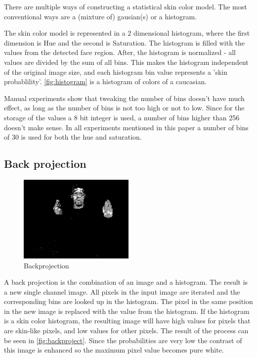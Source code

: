 There are multiple ways of constructing a statistical skin color model. The most conventional ways are a (mixture of) gausian(s) or a histogram. 

The skin color model is represented in a 2 dimensional histogram, where the first dimension is Hue and the second is Saturation. The histogram is filled with the values from the detected face region. After, the histogram is normalized - all values are divided by the sum of all bins. This makes the histogram independent of the original image size, and each histogram bin value represents a 'skin probablility'. \autoref{fig:histogram} is a histogram of colors of a caucasian.

Manual experiments show that tweaking the number of bins doesn't have much effect, as long as the number of bins is not too high or not to low. Since for the storage of the values a 8 bit integer is used, a number of bins higher than 256 doesn't make sense. In all experiments mentioned in this paper a number of bins of 30 is used for both the hue and saturation.

\subsection*{Back projection}

\begin{figure}[htbp]
    \center{}
    \includegraphics[width=0.5\textwidth]{figures/pipeline/backproject.jpg}
 	\caption{Backprojection}
	\label{fig:backproject}
\end{figure}


A back projection is the combination of an image and a histogram. The result is a new single channel image. All pixels in the input image are iterated and the corresponding bins are looked up in the histogram. The pixel in the same position in the new image is replaced with the value from the histogram. If the histogram is a skin color histogram, the resulting image will have high values for pixels that are skin-like pixels, and low values for other pixels. The result of the process can be seen in \autoref{fig:backproject}. Since the probabilities are very low the contrast of this image is enhanced so the maximum pixel value becomes pure white.


